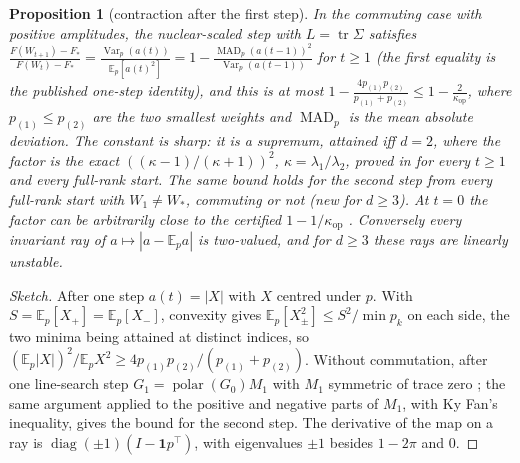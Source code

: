 \documentclass[11pt]{article}
\newtheorem{proposition}[theorem]{Proposition}
\theoremstyle{remark}
\newcommand{\E}{\mathbb{E}}
\newcommand{\abs}[1]{\left|#1\right|}
\newcommand{\tr}{\operatorname{tr}}
\newcommand{\diag}{\operatorname{diag}}
\newcommand{\polar}{\operatorname{polar}}
\newcommand{\Var}{\operatorname{Var}}
\newcommand{\MAD}{\operatorname{MAD}}
\newcommand{\kop}{\kappa_{\mathrm{op}}}
\newcommand{\ones}{\mathbf{1}}
\begin{document}
\begin{proposition}[contraction after the first step]\label{prop:mad}
In the commuting case with positive amplitudes, the nuclear-scaled step with $L=\tr\Sigma$ satisfies
$\frac{F(W_{t+1})-F_\ast}{F(W_t)-F_\ast}=\frac{\Var_p(a(t))}{\E_p[a(t)^2]}=1-\frac{\MAD_p(a(t-1))^2}{\Var_p(a(t-1))}$ for
$t\ge1$ (the first equality is the published one-step identity), and this is at most
$1-\frac{4p_{(1)}p_{(2)}}{p_{(1)}+p_{(2)}}\le1-\frac2{\kop}$, where $p_{(1)}\le p_{(2)}$ are
the two smallest weights and $\MAD_p$ is the mean absolute deviation. The constant is sharp: it is a supremum, attained
iff $d=2$, where the factor is the exact $((\kappa-1)/(\kappa+1))^2$, $\kappa=\lambda_1/\lambda_2$, proved in
\cite{shulgin2026quadratic} for every $t\ge1$ and every full-rank start. The same bound holds for the second step from
every full-rank start with $W_1\ne W_\ast$, commuting or not (new for $d\ge3$). At $t=0$ the factor can be arbitrarily
close to the certified $1-1/\kop$ \cite{shulgin2026quadratic}. Conversely every invariant ray of
$a\mapsto\abs{a-\E_pa}$ is two-valued, and for $d\ge3$ these rays are linearly unstable.
\end{proposition}
\begin{proof}[Sketch]
After one step $a(t)=\abs X$ with $X$ centred under $p$. With $S=\E_p[X_+]=\E_p[X_-]$, convexity gives
$\E_p[X_\pm^2]\le S^2/\min p_k$ on each side, the two minima being attained at distinct indices, so
$(\E_p\abs X)^2/\E_pX^2\ge4p_{(1)}p_{(2)}/(p_{(1)}+p_{(2)})$. Without commutation, after one line-search step
$G_1=\polar(G_0)M_1$ with $M_1$ symmetric of trace zero \cite{shulgin2026quadratic}; the same argument applied to the
positive and negative parts of $M_1$, with Ky Fan's inequality, gives the bound for the second step. The derivative of
the map on a ray is $\diag(\pm1)(I-\ones p^\top)$, with eigenvalues $\pm1$ besides $1-2\pi$ and $0$.
\end{proof}
\end{document}
